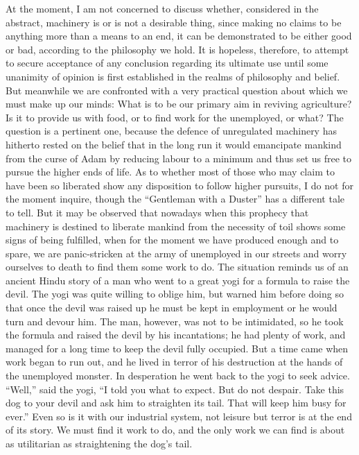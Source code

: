 \documentclass{book}
\begin{document}
At the moment, I am not concerned to discuss whether, considered in the abstract, machinery is or is not a desirable thing, since making no claims to be anything more than a means to an end, it can be demonstrated to be either good or bad, according to the philosophy we hold. It is hopeless, therefore, to attempt to secure acceptance of any conclusion regarding its ultimate use until some unanimity of opinion is first established in the realms of philosophy and belief. But meanwhile we are confronted with a very practical question about which we must make up our minds: What is to be our primary aim in reviving agriculture? Is it to provide us with food, or to find work for the unemployed, or what? The question is a pertinent one, because the defence of unregulated machinery has hitherto rested on the belief that in the long run it would emancipate mankind from the curse of Adam by reducing labour to a minimum and thus set us free to pursue the higher ends of life. As to whether most of those who may claim to have been so liberated show any disposition to follow higher pursuits, I do not for the moment inquire, though the “Gentleman with a Duster” has a different tale to tell. But it may be observed that nowadays when this prophecy that machinery is destined to liberate mankind from the necessity of toil shows some signs of being fulfilled, when for the moment we have produced enough and to spare, we are panic-stricken at the army of unemployed in our streets and worry ourselves to death to find them some work to do. The situation reminds us of an ancient Hindu story of a man who went to a great yogi for a formula to raise the devil. The yogi was quite willing to oblige him, but warned him before doing so that once the devil was raised up he must be kept in employment or he would turn and devour him. The man, however, was not to be intimidated, so he took the formula and raised the devil by his incantations; he had plenty of work, and managed for a long time to keep the devil fully occupied. But a time came when work began to run out, and he lived in terror of his destruction at the hands of the unemployed monster. In desperation he went back to the yogi to seek advice. “Well,” said the yogi, “I told you what to expect. But do not despair. Take this dog to your devil and ask him to straighten its tail. That will keep him busy for ever.” Even so is it with our industrial system, not leisure but terror is at the end of its story. We must find it work to do, and the only work we can find is about as utilitarian as straightening the dog’s tail.
\end{document}
